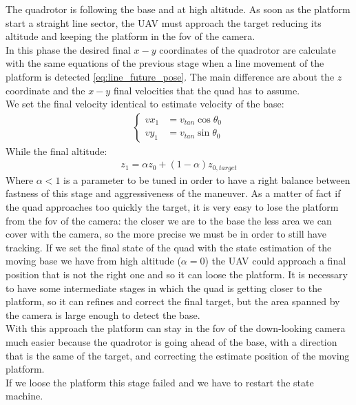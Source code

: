 The quadrotor is following the base and at high altitude. As soon as the platform start a straight line sector, the UAV must approach the target reducing its altitude and keeping the platform in the fov of the camera.\\
In this phase the desired final $x-y$ coordinates of the quadrotor  are calculate with the same equations of the previous stage when a line movement of the platform is detected \ref{eq:line_future_pose}. 
The main difference are about the $z$ coordinate and the $x-y$ final velocities that the quad has to assume.\\
We set the final velocity identical to estimate velocity of the base:
\begin{align}
\begin{cases}
vx_1 &= v_{tan}\cos{\theta_0}\\
vy_1 &= v_{tan}\sin{\theta_0}
\label{eq:finalstavelocity}
\end{cases}
\end{align}
While the final altitude:
\begin{align}
z_1 = \alpha z_0 + (1 - \alpha) z_{0,target}
\label{eq:finalz}
\end{align}
Where $\alpha <  1$ is a parameter to be tuned in order to have a right balance between fastness of this stage and aggressiveness of the maneuver. As a matter of fact if the quad approaches too quickly the target, it is very easy to lose the platform from the fov of the camera: the closer we are to the base the less area we can cover with the camera, so the more precise we must be in order to still have tracking. If we set the final state of the quad with the state estimation of the moving base we have from high altitude ($\alpha = 0$) 
the UAV could approach a final position that is not the right one and so it can loose the platform. It is necessary to have some intermediate stages in which the quad is getting closer to the platform, so it can refines and correct the final target, but the area spanned by the camera is large enough to detect the base.\\

With this approach the platform can stay in the fov of the down-looking camera much easier because the quadrotor is going ahead of the base, with a direction that is the same of the target, and correcting the estimate position of the moving platform. \\
If we loose the platform this stage failed and we have to restart the state machine.\\

